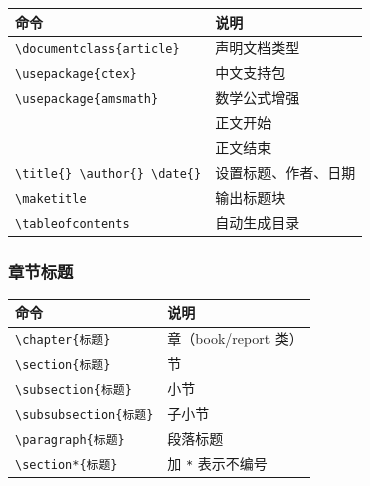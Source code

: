 \begin{center}
\begin{tabular}{ll}
\toprule
命令 & 说明 \\
\midrule
\verb|\documentclass{article}| & 声明文档类型 \\
\verb|\usepackage{ctex}| & 中文支持包 \\
\verb|\usepackage{amsmath}| & 数学公式增强 \\
\verb|| & 正文开始 \\
\verb|| & 正文结束 \\
\verb|\title{} \author{} \date{}| & 设置标题、作者、日期 \\
\verb|\maketitle| & 输出标题块 \\
\verb|\tableofcontents| & 自动生成目录 \\
\bottomrule
\end{tabular}
\end{center}

\subsubsection{章节标题}

\begin{center}
\begin{tabular}{ll}
\toprule
命令 & 说明 \\
\midrule
\verb|\chapter{标题}| & 章（book/report 类） \\
\verb|\section{标题}| & 节 \\
\verb|\subsection{标题}| & 小节 \\
\verb|\subsubsection{标题}| & 子小节 \\
\verb|\paragraph{标题}| & 段落标题 \\
\verb|\section*{标题}| & 加 \verb|*| 表示不编号 \\
\bottomrule
\end{tabular}
\end{center}

